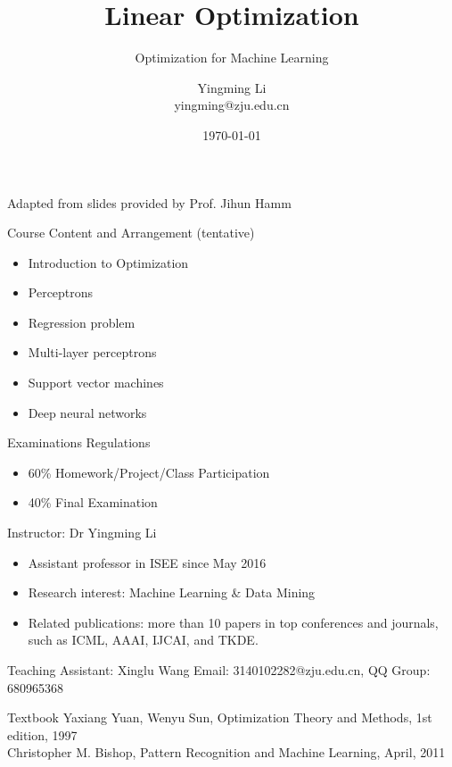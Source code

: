 \documentclass[notes]{beamer}
\title[Opt for ML]{Linear Optimization}
\subtitle{Optimization for Machine Learning}
\author[YingmingLi]{Yingming Li \\ yingming@zju.edu.cn}
\institute[DSERC, ZJU]{Data Science \& Engineering Research Center, ZJU}
\date[\today]{\today}
\begin{document}
\begin{frame}
	\titlepage
	Adapted from slides provided by Prof. Jihun Hamm

\end{frame}

\begin{frame}
	\begin{block}{Course Content and Arrangement (tentative)}
		\begin{itemize}
			\item Introduction to Optimization
			\item Perceptrons
			\item Regression problem
			\item Multi-layer perceptrons
			\item Support vector machines
			\item Deep neural networks
		\end{itemize}
	\end{block}
	\begin{block}{Examinations Regulations}
		\begin{itemize}
			\item 60\% Homework/Project/Class Participation
			\item 40\% Final Examination
		\end{itemize}
	\end{block}
\end{frame}

\begin{frame}
	\begin{block}{Instructor: Dr Yingming Li}
		\begin{itemize}
			\item Assistant professor in ISEE since May 2016
			\item Research interest: Machine Learning \& Data Mining
			\item Related publications: more than 10 papers in top conferences and journals, such as ICML, AAAI, IJCAI, and TKDE.
		\end{itemize}
	\end{block}
	\begin{block}{Teaching Assistant: Xinglu Wang}
		Email: 3140102282@zju.edu.cn, QQ Group: 680965368
	\end{block}
	\begin{block}{Textbook}
		Yaxiang Yuan, Wenyu Sun, Optimization Theory and Methods, 1st edition, 1997\\
		Christopher M. Bishop, Pattern Recognition and Machine Learning, April, 2011
	\end{block}
\end{frame}
\end{document}
